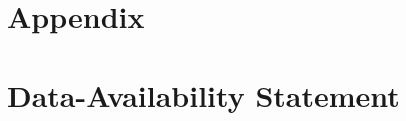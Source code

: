 \documentclass[acmsmall]{acmart}\settopmatter{}
\theoremstyle{definition}
\begin{document}




\appendix
\section{Appendix}


\section{Data-Availability Statement}



\end{document}
